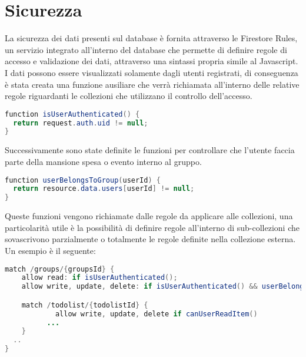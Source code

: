 \section{Sicurezza}
La sicurezza dei dati presenti sul database è fornita attraverso le Firestore Rules, un servizio integrato all'interno del database che permette di definire regole di accesso e validazione dei dati, attraverso una sintassi propria simile al Javascript.\\
I dati possono essere visualizzati solamente dagli utenti registrati, di conseguenza è stata creata una funzione ausiliare che verrà richiamata all'interno delle relative regole riguardanti le collezioni che utilizzano il controllo dell'accesso.


\begin{lstlisting}[language=java,caption={Firestore Rules Controllo autenticazione}]
function isUserAuthenticated() {
  return request.auth.uid != null;
}
\end{lstlisting}

Successivamente sono state definite le funzioni per controllare che l'utente faccia parte della mansione spesa o evento interno al gruppo.

\begin{lstlisting}[language=java,caption={Firestore Rules Controllo Visibilità}]
function userBelongsToGroup(userId) {
  return resource.data.users[userId] != null;
}
\end{lstlisting}
Queste funzioni vengono richiamate dalle regole da applicare alle collezioni, una particolarità utile è la possibilità di definire regole all'interno di sub-collezioni che sovascrivono parzialmente o totalmente le regole definite nella collezione esterna.
Un esempio è il seguente:

\begin{lstlisting}[language=java,caption={Firestore Rules Controllo Visibilità}]
match /groups/{groupsId} {
    allow read: if isUserAuthenticated();
    allow write, update, delete: if isUserAuthenticated() && userBelongsToGroup()

    match /todolist/{todolistId} {
      		allow write, update, delete if canUserReadItem()
          ...
    }
  ..
}
\end{lstlisting}
